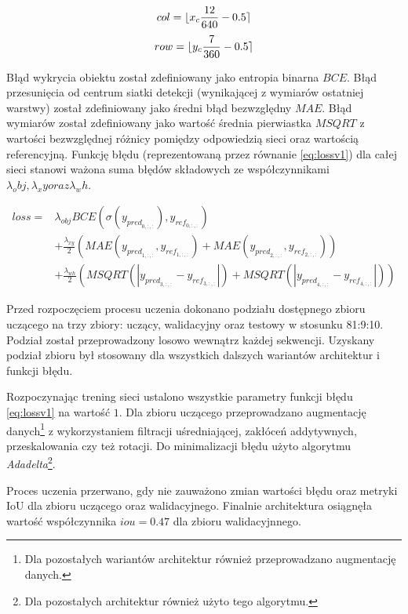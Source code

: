 \begin{equation}
col = \lfloor x_c \frac{12}{640} - 0.5\rceil
\label{eq:colv1}
\end{equation}
\begin{equation}
row = \lfloor y_c \frac{7}{360} - 0.5\rceil
\label{eq:rowv1}
\end{equation}


Błąd wykrycia obiektu został zdefiniowany jako entropia binarna $BCE$. 
Błąd przesunięcia od centrum siatki detekcji (wynikającej z wymiarów ostatniej warstwy) został zdefiniowany jako średni błąd bezwzględny $MAE$. Błąd wymiarów został zdefiniowany jako wartość średnia pierwiastka $MSQRT$ z wartości bezwzględnej różnicy pomiędzy odpowiedzią sieci oraz wartością referencyjną.
Funkcję błędu (reprezentowaną przez równanie \eqref{eq:lossv1}) dla całej sieci stanowi ważona suma błędów składowych ze współczynnikami $\lambda_obj, \lambda_xy oraz \lambda_wh$. 

\begin{equation}
\begin{aligned}
loss =& \lambda_{obj} BCE(\sigma(y_{pred}_{0,:,:}), y_{ref}_{0,:,:}) \\
&+ \frac{\lambda_{xy}}{2}( MAE(y_{pred}_{1,:,:}, y_{ref}_{1,:,:}) + MAE(y_{pred}_{2,:,:}, y_{ref}_{2,:,:})) \\
&+ \frac{\lambda_{wh}}{2} (MSQRT(|y_{pred}_{3,:,:} - y_{ref}_{3,:,:}|) + MSQRT(|y_{pred}_{4,:,:} - y_{ref}_{4,:,:}|))
\end{aligned}
\label{eq:lossv1}
\end{equation}


Przed rozpoczęciem procesu uczenia dokonano podziału dostępnego zbioru uczącego na trzy zbiory: uczący, walidacyjny oraz testowy w stosunku 81:9:10. Podział został przeprowadzony losowo wewnątrz każdej sekwencji.
Uzyskany podział zbioru był stosowany dla wszystkich dalszych wariantów architektur i funkcji błędu.

Rozpoczynając trening sieci ustalono wszystkie parametry funkcji błędu \eqref{eq:lossv1} na wartość $1$.
Dla zbioru uczącego przeprowadzano augmentację danych\footnote{Dla pozostałych wariantów architektur również przeprowadzano augmentację danych.} z wykorzystaniem filtracji uśredniającej, zakłóceń addytywnych, przeskalowania czy też rotacji.
Do minimalizacji błędu użyto algorytmu \emph{Adadelta}\footnote{Dla pozostałych architektur również użyto tego algorytmu.}.

Proces uczenia przerwano, gdy nie zauważono zmian wartości błędu oraz metryki IoU dla zbioru uczącego oraz walidacyjnego.
Finalnie architektura osiągnęła wartość współczynnika $iou = 0.47$ dla zbioru walidacyjnnego.

